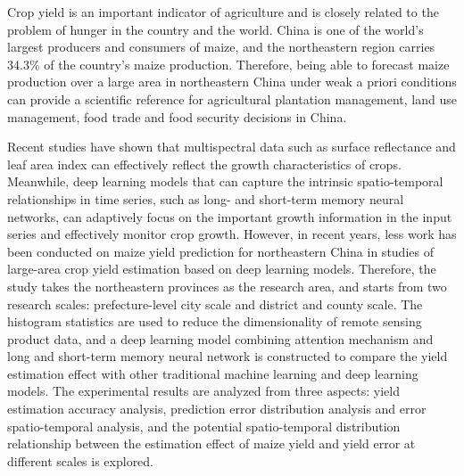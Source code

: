 \par Crop yield is an important indicator of agriculture and is closely related to the problem of hunger in the country and the world. China is one of the world's largest producers and consumers of maize, and the northeastern region carries 34.3\% of the country's maize production. Therefore, being able to forecast maize production over a large area in northeastern China under weak a priori conditions can provide a scientific reference for agricultural plantation management, land use management, food trade and food security decisions in China.

\par Recent studies have shown that multispectral data such as surface reflectance and leaf area index can effectively reflect the growth characteristics of crops. Meanwhile, deep learning models that can capture the intrinsic spatio-temporal relationships in time series, such as long- and short-term memory neural networks, can adaptively focus on the important growth information in the input series and effectively monitor crop growth. However, in recent years, less work has been conducted on maize yield prediction for northeastern China in studies of large-area crop yield estimation based on deep learning models. Therefore, the study takes the northeastern provinces as the research area, and starts from two research scales: prefecture-level city scale and district and county scale. The histogram statistics are used to reduce the dimensionality of remote sensing product data, and a deep learning model combining attention mechanism and long and short-term memory neural network is constructed to compare the yield estimation effect with other traditional machine learning and deep learning models. The experimental results are analyzed from three aspects: yield estimation accuracy analysis, prediction error distribution analysis and error spatio-temporal analysis, and the potential spatio-temporal distribution relationship between the estimation effect of maize yield and yield error at different scales is explored.

